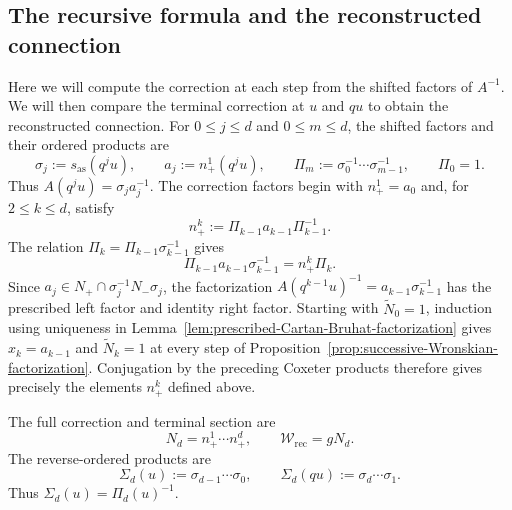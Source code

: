 \documentclass[11pt,leqno]{amsart}
\numberwithin{equation}{section}
\theoremstyle{plain}
\theoremstyle{definition}
\theoremstyle{plain}
\theoremstyle{definition}
\theoremstyle{remark}
\begin{document}
\subsection{The recursive formula and the reconstructed connection}
Here we will compute the correction at each step from the shifted factors of $A^{-1}$.  We will then compare the terminal correction at $u$ and $qu$ to obtain the reconstructed connection.  For $0\le j\le d$ and $0\le m\le d$, the shifted factors and their ordered products are
\[
 \sigma_j:=s_{\mathrm{as}}(q^ju),
 \qquad
 a_j:=n_+^1(q^ju),
 \qquad
 \Pi_m:=\sigma_0^{-1}\cdots \sigma_{m-1}^{-1},
 \qquad \Pi_0=1.
\]
Thus $A(q^ju)=\sigma_ja_j^{-1}$.  The correction factors begin with $n_+^1=a_0$ and, for $2\le k\le d$, satisfy
\begin{equation}\label{eq:canonical-root-layer-recursion}
 n_+^k:=\Pi_{k-1}a_{k-1}\Pi_{k-1}^{-1}.
\end{equation}
The relation $\Pi_k=\Pi_{k-1}\sigma_{k-1}^{-1}$ gives
\begin{equation}\label{eq:canonical-step-with-right-factor}
 \Pi_{k-1}a_{k-1}\sigma_{k-1}^{-1}=n_+^k\Pi_k.
\end{equation}
Since $a_j\in N_+\cap \sigma_j^{-1}N_-\sigma_j$, the factorization $A(q^{k-1}u)^{-1}=a_{k-1}\sigma_{k-1}^{-1}$ has the prescribed left factor and identity right factor.  Starting with $\widetilde N_0=1$, induction using uniqueness in Lemma~\ref{lem:prescribed-Cartan-Bruhat-factorization} gives $x_k=a_{k-1}$ and $\widetilde N_k=1$ at every step of Proposition~\ref{prop:successive-Wronskian-factorization}.  Conjugation by the preceding Coxeter products therefore gives precisely the elements $n_+^k$ defined above.

The full correction and terminal section are
\[
 N_d=n_+^1\cdots n_+^d,
 \qquad
 \mathscr W_{\mathrm{rec}}=gN_d.
\]
The reverse-ordered products are
\begin{equation}\label{eq:Sigma-d-def}
 \Sigma_d(u):=\sigma_{d-1}\cdots \sigma_0,
 \qquad
 \Sigma_d(qu):=\sigma_d\cdots \sigma_1.
\end{equation}
Thus $\Sigma_d(u)=\Pi_d(u)^{-1}$.
\end{document}
